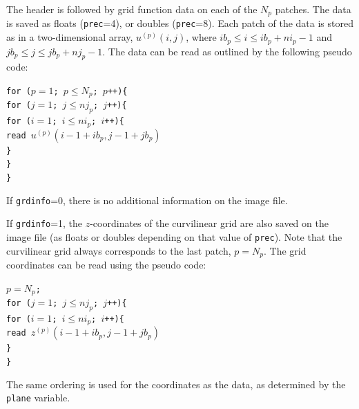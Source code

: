 \documentclass[11pt]{report}
\begin{document}
The header is followed by grid function data on each of the $N_p$ patches. The data is saved as
floats ({\tt prec}=4), or doubles ({\tt prec}=8). Each patch of the data is stored as in a
two-dimensional array, $u^{(p)}(i,j)$, where $ib_p\leq i \leq ib_p+ni_p-1$ and $jb_p\leq j \leq
jb_p+nj_p-1$. The data can be read as outlined by the following pseudo code:
\begin{flushleft}
{\tt for ($p=1$; $p\leq N_p$; $p$++)\{\\
\hspace{5mm}for ($j=1$; $j\leq nj_p$; $j$++)\{\\
\hspace{10mm}for ($i=1$; $i\leq ni_p$; $i$++)\{\\
\hspace{15mm}read $u^{(p)}(i-1+ib_p, j-1+jb_p)$\\
\hspace{10mm}\}\\
\hspace{5mm}\}\\
\}}
\end{flushleft}
If {\tt grdinfo}=0, there is no additional information on the image file.

If {\tt grdinfo}=1, the $z$-coordinates of the curvilinear grid are also saved on the image file
(as floats or doubles depending on that value of {\tt prec}). Note that the curvilinear grid always
corresponds to the last patch, $p=N_p$. The grid coordinates can be read using the pseudo code:
\begin{flushleft}
{\tt $p=N_p$;\\
for ($j=1$; $j\leq nj_p$; $j$++)\{\\
\hspace{5mm}for ($i=1$; $i\leq ni_p$; $i$++)\{\\
\hspace{10mm}read $z^{(p)}(i-1+ib_p, j-1+jb_p)$\\
\hspace{5mm}\}\\
\}}
\end{flushleft}
The same ordering is used for the coordinates as the data, as determined by the {\tt plane} variable.

\end{document}
